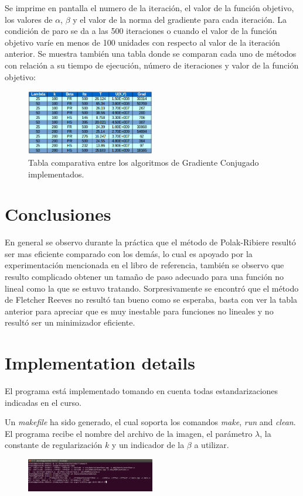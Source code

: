 \documentclass[10pt,journal,compsoc]{styles/IEEEtran}
\begin{document}
Se imprime en pantalla el numero de la iteración, el valor de la función objetivo, los valores de $\alpha$, $\beta$ y el valor de la norma del gradiente para cada iteración. La condición de paro se da a las 500 iteraciones o cuando el valor de la función objetivo varíe en menos de 100 unidades con respecto al valor de la iteración anterior. Se muestra también una tabla donde se comparan cada uno de métodos con relación a su tiempo de ejecución, número de iteraciones y valor de la función objetivo:\\

\begin{figure}[hbtp]
\centering
\includegraphics[width=0.5\textwidth]{tabla.png}
\caption{Tabla comparativa entre los algoritmos de Gradiente Conjugado implementados.}
\end{figure}

\section{Conclusiones}

En general se observo durante la pr\'actica que el método de Polak-Ribiere result\'o ser mas eficiente comparado con los demás, lo cual es apoyado por la experimentación mencionada en el libro de referencia, también se observo que resulto complicado obtener un tamaño de paso adecuado para una función no lineal como la que se estuvo tratando. Sorpresivamente se encontró que el método de Fletcher Reeves no result\'o tan bueno como se esperaba, basta con ver la tabla anterior para apreciar que es muy inestable para funciones no lineales y no result\'o ser un minimizador eficiente.\\





\appendix
\section{Implementation details}
El programa est\'a implementado tomando en cuenta todas estandarizaciones indicadas en el curso.

Un \textit{makefile} ha sido generado, el cual soporta los comandos \textit{make}, \textit{run} and \textit{clean}. El programa recibe el nombre del archivo de la imagen, el parámetro $\lambda$, la constante de regularizaci\'on $k$ y un indicador de la $\beta$ a utilizar.

\begin{figure}[hbtp]
\centering
\includegraphics[width=0.5\textwidth]{screen.png}
\caption*{}
\end{figure}
\end{document}
